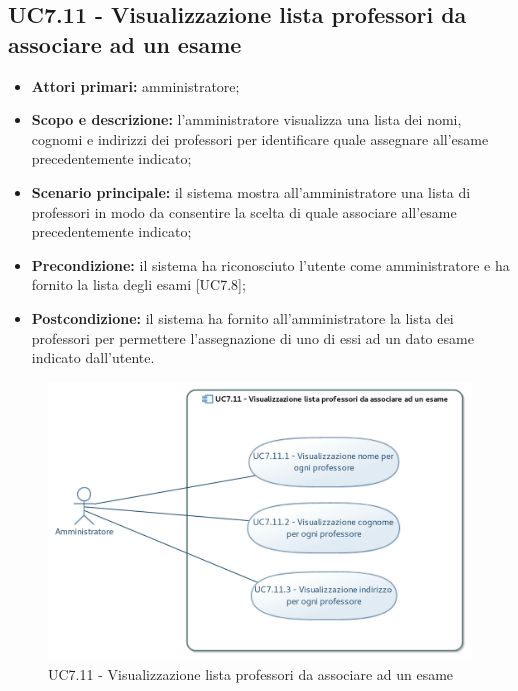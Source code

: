 \documentclass[AnalisiDeiRequisiti.tex]{subfiles}
\begin{document}
\subsection{UC7.11 - Visualizzazione lista professori da associare ad un esame}
\begin{itemize}
	\item \textbf{Attori primari:} amministratore;
	\item \textbf{Scopo e descrizione:} l'amministratore visualizza una lista dei nomi, cognomi e indirizzi dei professori per identificare quale assegnare all'esame precedentemente indicato;
	\item \textbf{Scenario principale:} il sistema mostra all'amministratore una lista di professori in modo da consentire la scelta di quale associare all'esame precedentemente indicato;
	\item \textbf{Precondizione:} il sistema ha riconosciuto l'utente come amministratore e ha fornito la lista degli esami [UC7.8];  
	\item \textbf{Postcondizione:} il sistema ha fornito all'amministratore la lista dei professori per permettere l'assegnazione di uno di essi ad un dato esame indicato dall'utente.
\end{itemize}
\begin{figure}[H]
	\centering
	\includegraphics[width=0.7\linewidth]{UC7_11.jpg}
	\caption{UC7.11 - Visualizzazione lista professori da associare ad un esame}
	\label{UC7.11 - Visualizzazione lista professori da associare ad un esame}
\end{figure}
\end{document}
